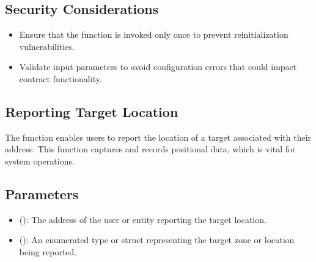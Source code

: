\documentclass[a4paper,10pt,english]{sphinxmanual}
\begin{document}
\subsection{Security Considerations}
\label{\detokenize{docs_consensus_mechanism_contract:security-considerations}}\begin{itemize}
\item {} 
\sphinxAtStartPar
{} Ensure that the  function is invoked only once to prevent re\sphinxhyphen{}initialization vulnerabilities.

\item {} 
\sphinxAtStartPar
{} Validate input parameters to avoid configuration errors that could impact contract functionality.

\end{itemize}


\subsection{Reporting Target Location}
\label{\detokenize{docs_consensus_mechanism_contract:reporting-target-location}}
\sphinxAtStartPar
The  function enables users to report the location of a target associated with their address. This function captures and records positional data, which is vital for system operations.

\begin{sphinxVerbatim}[commandchars=\\\{\}]
\end{sphinxVerbatim}


\subsection{Parameters}
\label{\detokenize{docs_consensus_mechanism_contract:id1}}\begin{itemize}
\item {} 
\sphinxAtStartPar
{} ():
The address of the user or entity reporting the target location.

\item {} 
\sphinxAtStartPar
{} ():
An enumerated type or struct representing the target zone or location being reported.

\end{itemize}
\end{document}
